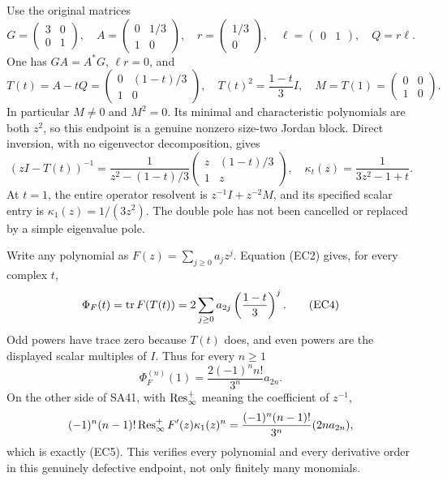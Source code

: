 Use the original matrices
\begin{equation}
 G=\begin{pmatrix}3&0\\0&1\end{pmatrix},\quad
 A=\begin{pmatrix}0&1/3\\1&0\end{pmatrix},\quad
 r=\begin{pmatrix}1/3\\0\end{pmatrix},\quad
 \ell=\begin{pmatrix}0&1\end{pmatrix},\quad Q=r\ell.
 \tag{EC1}
\end{equation}
One has \(GA=A^*G\), \(\ell r=0\), and
\begin{equation}
 T(t)=A-tQ=\begin{pmatrix}0&(1-t)/3\\1&0\end{pmatrix},
 \quad T(t)^2=\frac{1-t}{3}I,\quad
 M=T(1)=\begin{pmatrix}0&0\\1&0\end{pmatrix}.
 \tag{EC2}
\end{equation}
In particular \(M\ne0\) and \(M^2=0\). Its minimal and
characteristic polynomials are both \(z^2\), so this endpoint is a
genuine nonzero size-two Jordan block.
Direct inversion, with no eigenvector decomposition, gives
\begin{equation}
 (zI-T(t))^{-1}
 =\frac1{z^2-(1-t)/3}
     \begin{pmatrix}z&(1-t)/3\\1&z\end{pmatrix},
 \quad
 \kappa_t(z)=\frac1{3z^2-1+t}.
 \tag{EC3}
\end{equation}
At \(t=1\), the entire operator resolvent is
\(z^{-1}I+z^{-2}M\), and its specified scalar entry is
\(\kappa_1(z)=1/(3z^2)\). The double pole has not been
cancelled or replaced by a simple eigenvalue pole.

Write any polynomial as \(F(z)=\sum_{j\ge0}a_jz^j\).
Equation (EC2) gives, for every complex \(t\),
\begin{equation}
 \Phi_F(t)=\operatorname{tr} F(T(t))
     =2\sum_{j\ge0}a_{2j}\left(\frac{1-t}{3}\right)^j .
 \tag{EC4}
\end{equation}
Odd powers have trace zero because \(T(t)\) does, and even
powers are the displayed scalar multiples of \(I\).
Thus for every \(n\ge1\)
\begin{equation}
 \Phi_F^{(n)}(1)=\frac{2(-1)^n n!}{3^n}a_{2n}.
 \tag{EC5}
\end{equation}
On the other side of SA41, with \(\operatorname{Res}_\infty^+\) meaning the
coefficient of \(z^{-1}\),
\[
 (-1)^n(n-1)!\operatorname{Res}_\infty^+F'(z)\kappa_1(z)^n
 =\frac{(-1)^n(n-1)!}{3^n}(2n a_{2n}),
\]
which is exactly (EC5). This verifies every polynomial and
every derivative order in this genuinely defective endpoint,
not only finitely many monomials.

